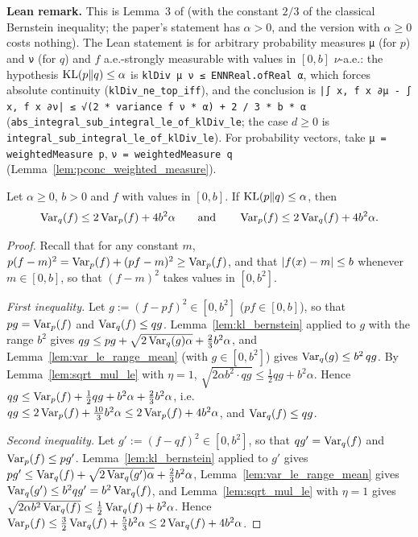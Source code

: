 \textbf{Lean remark.} This is Lemma~3 of \cite{talebi2018variance} (with the constant $2/3$ of
the classical Bernstein inequality; the paper's statement has $\alpha > 0$, and the version with
$\alpha \ge 0$ costs nothing). The Lean statement is for arbitrary probability measures
\texttt{μ} (for $p$) and \texttt{ν} (for $q$) and $f$ a.e.-strongly measurable with values in
$[0, b]$ $\nu$-a.e.: the hypothesis $\mathrm{KL}(p\|q) \le \alpha$ is
\texttt{klDiv μ ν ≤ ENNReal.ofReal α}, which forces absolute continuity
(\texttt{klDiv\_ne\_top\_iff}), and the conclusion is
\texttt{|∫ x, f x ∂μ - ∫ x, f x ∂ν| ≤ √(2 * variance f ν * α) + 2 / 3 * b * α}
(\texttt{abs\_integral\_sub\_integral\_le\_of\_klDiv\_le}; the case $d \ge 0$ is
\texttt{integral\_sub\_integral\_le\_of\_klDiv\_le}). For probability vectors, take
\texttt{μ = weightedMeasure p}, \texttt{ν = weightedMeasure q} (Lemma~\ref{lem:pconc_weighted_measure}).

\begin{lemma}\label{lem:kl_transport_var}
\leanok
Let $\alpha \ge 0$, $b > 0$ and $f$ with values in $[0, b]$. If $\mathrm{KL}(p \| q) \le \alpha$, then
\[
  \operatorname{Var}_q(f) \le 2\operatorname{Var}_p(f) + 4b^2\alpha \qquad \text{and} \qquad \operatorname{Var}_p(f) \le 2\operatorname{Var}_q(f) + 4b^2\alpha .
\]
\end{lemma}

\begin{proof}
\leanok
Recall that for any constant $m$, $p(f - m)^2 = \operatorname{Var}_p(f) + (pf - m)^2 \ge \operatorname{Var}_p(f)$, and that
$\lvert f(x) - m \rvert \le b$ whenever $m \in [0, b]$, so that $(f - m)^2$ takes values in $[0, b^2]$.

\emph{First inequality.} Let $g := (f - pf)^2 \in [0, b^2]$ ($pf \in [0, b]$), so that $pg = \operatorname{Var}_p(f)$
and $\operatorname{Var}_q(f) \le qg$. Lemma~\ref{lem:kl_bernstein} applied to $g$ with the range $b^2$ gives
$qg \le pg + \sqrt{2\operatorname{Var}_q(g)\alpha} + \frac23 b^2\alpha$, and Lemma~\ref{lem:var_le_range_mean}
(with $g \in [0, b^2]$) gives $\operatorname{Var}_q(g) \le b^2\, qg$. By Lemma~\ref{lem:sqrt_mul_le} with $\eta = 1$,
$\sqrt{2\alpha b^2 \cdot qg} \le \frac12 qg + b^2\alpha$. Hence
$qg \le \operatorname{Var}_p(f) + \frac12 qg + b^2\alpha + \frac23 b^2\alpha$, i.e.\
$qg \le 2\operatorname{Var}_p(f) + \frac{10}{3} b^2\alpha \le 2\operatorname{Var}_p(f) + 4b^2\alpha$, and $\operatorname{Var}_q(f) \le qg$.

\emph{Second inequality.} Let $g' := (f - qf)^2 \in [0, b^2]$, so that $qg' = \operatorname{Var}_q(f)$ and
$\operatorname{Var}_p(f) \le pg'$. Lemma~\ref{lem:kl_bernstein} applied to $g'$ gives
$pg' \le \operatorname{Var}_q(f) + \sqrt{2\operatorname{Var}_q(g')\alpha} + \frac23 b^2\alpha$, Lemma~\ref{lem:var_le_range_mean}
gives $\operatorname{Var}_q(g') \le b^2 qg' = b^2\operatorname{Var}_q(f)$, and Lemma~\ref{lem:sqrt_mul_le} with $\eta = 1$ gives
$\sqrt{2\alpha b^2 \operatorname{Var}_q(f)} \le \frac12\operatorname{Var}_q(f) + b^2\alpha$. Hence
$\operatorname{Var}_p(f) \le \frac32\operatorname{Var}_q(f) + \frac53 b^2\alpha \le 2\operatorname{Var}_q(f) + 4b^2\alpha$.
\end{proof}

